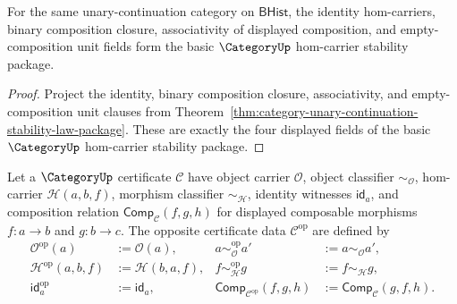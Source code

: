 \begin{corollary}
\label{cor:category-hom-carrier-stability-law-package}
For the same unary-continuation category on $\mathsf{BHist}$, the identity
hom-carriers, binary composition closure, associativity of displayed
composition, and empty-composition unit fields form the basic $\CategoryUp$
hom-carrier stability package.
\end{corollary}
\begin{proof}
Project the identity, binary composition closure, associativity, and
empty-composition unit clauses from
Theorem~\ref{thm:category-unary-continuation-stability-law-package}. These are
exactly the four displayed fields of the basic $\CategoryUp$ hom-carrier
stability package.
\end{proof}
\begin{definition}
\label{def:opposite-category-certificate-data}
Let a $\CategoryUp$ certificate $\mathcal C$ have object carrier
$\mathcal O$, object classifier $\sim_{\mathcal O}$, hom-carrier
$\mathcal H(a,b,f)$, morphism classifier $\sim_{\mathcal H}$, identity
witnesses $\mathsf{id}_a$, and composition relation
$\mathsf{Comp}_{\mathcal C}(f,g,h)$ for displayed composable morphisms
$f:a\to b$ and $g:b\to c$. The opposite certificate data
$\mathcal C^{\mathrm{op}}$ are defined by
$$
\begin{aligned}
\mathcal O^{\mathrm{op}}(a)&:=\mathcal O(a),&
 a\sim_{\mathcal O}^{\mathrm{op}}a'&:=a\sim_{\mathcal O}a',\\
\mathcal H^{\mathrm{op}}(a,b,f)&:=\mathcal H(b,a,f),&
 f\sim_{\mathcal H}^{\mathrm{op}}g&:=f\sim_{\mathcal H}g,\\
\mathsf{id}^{\mathrm{op}}_a&:=\mathsf{id}_a,&
\mathsf{Comp}_{\mathcal C^{\mathrm{op}}}(f,g,h)&:=
\mathsf{Comp}_{\mathcal C}(g,f,h).
\end{aligned}
$$
\end{definition}

